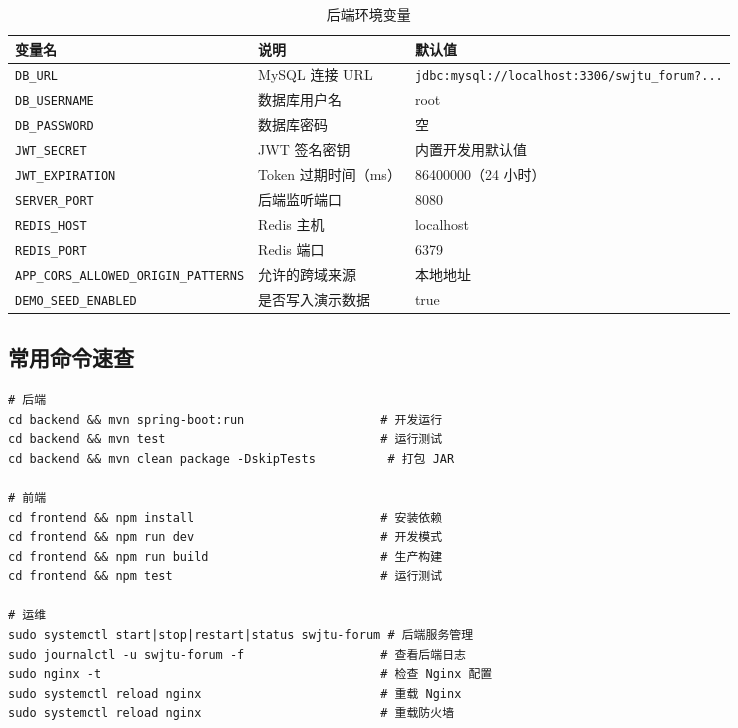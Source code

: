 \documentclass[bwprint]{report}
\begin{document}
\begin{table}[H]
    \caption{后端环境变量}
    \label{tab:env-vars}
    \centering
    \small
    \begin{tabular}{lll}
        \toprule[1.5pt]
        变量名 & 说明 & 默认值 \\
        \midrule[1pt]
        \texttt{DB\_URL} & MySQL 连接 URL & \texttt{jdbc:mysql://localhost:3306/swjtu\_forum?...} \\
        \texttt{DB\_USERNAME} & 数据库用户名 & root \\
        \texttt{DB\_PASSWORD} & 数据库密码 & 空 \\
        \texttt{JWT\_SECRET} & JWT 签名密钥 & 内置开发用默认值 \\
        \texttt{JWT\_EXPIRATION} & Token 过期时间（ms） & 86400000（24 小时） \\
        \texttt{SERVER\_PORT} & 后端监听端口 & 8080 \\
        \texttt{REDIS\_HOST} & Redis 主机 & localhost \\
        \texttt{REDIS\_PORT} & Redis 端口 & 6379 \\
        \texttt{APP\_CORS\_ALLOWED\_ORIGIN\_PATTERNS} & 允许的跨域来源 & 本地地址 \\
        \texttt{DEMO\_SEED\_ENABLED} & 是否写入演示数据 & true \\
        \bottomrule[1.5pt]
    \end{tabular}
\end{table}

\subsection{常用命令速查}

\begin{lstlisting}
# 后端
cd backend && mvn spring-boot:run                   # 开发运行
cd backend && mvn test                              # 运行测试
cd backend && mvn clean package -DskipTests          # 打包 JAR

# 前端
cd frontend && npm install                          # 安装依赖
cd frontend && npm run dev                          # 开发模式
cd frontend && npm run build                        # 生产构建
cd frontend && npm test                             # 运行测试

# 运维
sudo systemctl start|stop|restart|status swjtu-forum # 后端服务管理
sudo journalctl -u swjtu-forum -f                   # 查看后端日志
sudo nginx -t                                       # 检查 Nginx 配置
sudo systemctl reload nginx                         # 重载 Nginx
sudo systemctl reload nginx                         # 重载防火墙
\end{lstlisting}
\end{document}
